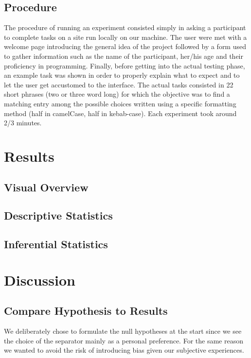\documentclass{article}
\begin{document}
\subsection{Procedure}
The procedure of running an experiment consisted simply in asking a participant to complete tasks on a site run locally on our machine. 
The user were met with a welcome page introducing the general idea of the project followed by a form used to gather information such as the 
name of the participant, her/his age and their proficiency in programming. Finally, before getting into the actual testing phase, an example 
task was shown in order to properly explain what to expect and to let the user get accustomed to the interface. The actual tasks consisted in 
22 short phrases (two or three word long) for which the objective was to find a matching entry among the possible choices written using a 
specific formatting method (half in camelCase, half in kebab-case).
Each experiment took around 2/3 minutes.
\section{Results}

\subsection{Visual Overview}

\subsection{Descriptive Statistics}

\subsection{Inferential Statistics}

\section{Discussion}

\subsection{Compare Hypothesis to Results}
We deliberately chose to formulate the null hypotheses at the start since we see the choice of the separator mainly as a personal preference. For the same reason 
we wanted to avoid the risk of introducing bias given our subjective experiences.
\end{document}
